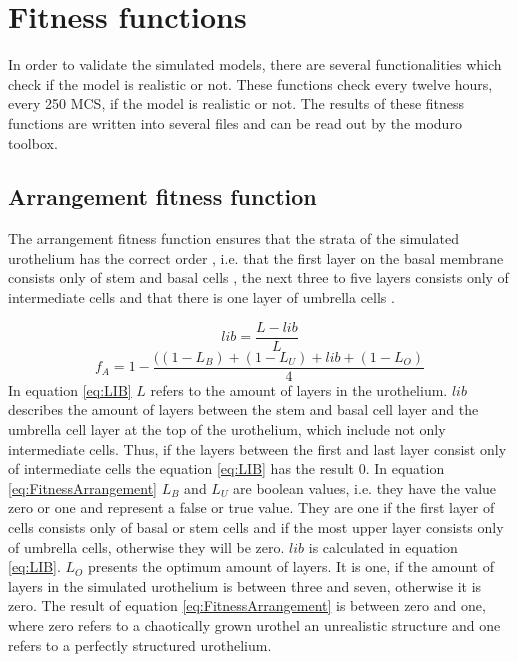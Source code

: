 \section{Fitness functions}\label{sec:fitnessFunctions}
In order to validate the simulated models, there are several functionalities which check if the model is realistic or not. These functions check every twelve hours, every 250 \ac{MCS}, if the model is realistic or not. The results of these fitness functions are written into several files and can be read out by the moduro toolbox.

\subsection{Arrangement fitness function} \label{subsec:ArrangementFitness}
The arrangement fitness function ensures that the strata of the simulated urothelium has the correct order \cite{Torelli2017}, i.e. that the first layer on the basal membrane consists only of stem and basal cells \cite{Yamany2014, Lazzeri2006}, the next three to five layers consists only of intermediate cells \cite{PuneetKhandelwal2009} and that there is one layer of umbrella cells \cite{PuneetKhandelwal2009, Yamany2014}.

\begin{equation}\label{eq:LIB}
lib = \dfrac{L - lib}{L}
\end{equation}
\begin{equation}\label{eq:FitnessArrangement} 
f_{A} = 1 - \dfrac{((1-L_{B})+(1-L_{U})+lib+(1-L_{O})}{4}
\end{equation}
In equation \ref{eq:LIB} $L$ refers to the amount of layers in the urothelium. $lib$ describes the amount of layers between the stem and basal cell layer and the umbrella cell layer at the top of the urothelium, which include not only intermediate cells. Thus, if the layers between the first and last layer consist only of intermediate cells the equation \ref{eq:LIB} has the result 0.\newline
In equation \ref{eq:FitnessArrangement} $L_{B}$ and $L_{U}$ are boolean values, i.e. they have the value zero or one and represent a false or true value. They are one if the first layer of cells consists only of basal or stem cells and if the most upper layer consists only of umbrella cells, otherwise they will be zero.
$lib$ is calculated in equation \ref{eq:LIB}. $L_{O}$ presents the optimum amount of layers. It is one, if the amount of layers in the simulated urothelium is between three and seven, otherwise it is zero. The result of equation \ref{eq:FitnessArrangement} is between zero and one, where zero refers to a chaotically grown urothel an unrealistic structure and one refers to a perfectly structured urothelium. \newline

